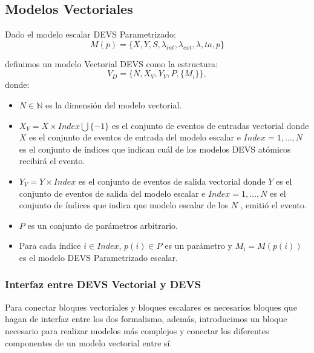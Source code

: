 	\subsection{Modelos Vectoriales}
	Dado el modelo escalar DEVS Parametrizado:
	\begin{equation}
		M (p) = \{X, Y, S, \lambda_{int} , \lambda_{ext} , \lambda, ta, p\}
		\end{equation}

		definimos un modelo Vectorial DEVS como la estructura:
		\begin{equation}
		V_D = \{N, X_V, Y_V, P, \{M_i\}\},
		\end{equation}
		donde:
		\begin{itemize}
		\item $N \in \mathbb{N}$ es la dimensión del modelo vectorial.

		\item $X_V = X \times Index \bigcup \{-1\}$ es el conjunto de eventos de entradas vectorial donde $X$ es el conjunto de eventos de entrada del modelo 
		escalar e $Index = {1, \ldots , N }$ es el conjunto de índices que indican cuál de los modelos DEVS atómicos recibirá el evento.

		\item $Y_V = Y \times Index$ es el conjunto de eventos de salida vectorial donde $Y$ es el conjunto de eventos de salida del modelo escalar e 
		$Index = {1, \ldots , N }$ es el conjunto de índices que indica que modelo escalar de los $N$ , emitió el evento. 

		\item $P$ es un conjunto de parámetros arbitrario.

		\item Para cada índice $i \in Index$, $p(i) \in P$ es un parámetro y $M_i = M (p(i))$ es el modelo DEVS Parametrizado escalar.
	\end{itemize}

	\subsubsection{Interfaz entre DEVS Vectorial y DEVS}
	Para conectar bloques vectoriales y bloques escalares es necesarios bloques que hagan de interfaz entre los dos formalismo, además, introducimos 
	un bloque necesario para realizar modelos más complejos y conectar los diferentes componentes de un modelo vectorial entre sí.

